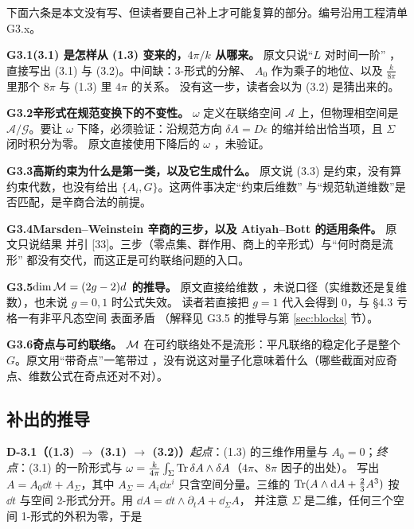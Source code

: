 下面六条是本文没有写、但读者要自己补上才可能复算的部分。编号沿用工程清单 G3.x。




\medskip
\noindent\textbf{G3.1}\quad \textbf{(3.1) 是怎样从 (1.3) 变来的，$4\pi/k$ 从哪来。}
原文只说“$L$ 对时间一阶” ，直接写出 (3.1) 与 (3.2)。中间缺：3-形式的分解、
$A_0$ 作为乘子的地位、以及 $\frac{k}{8\pi}$ 里那个 $8\pi$ 与 (1.3) 里 $4\pi$ 的关系。
没有这一步，读者会以为 (3.2) 是猜出来的。



\medskip
\noindent\textbf{G3.2}\quad \textbf{辛形式在规范变换下的不变性。}
$\omega$ 定义在联络空间 $\mathcal A$ 上，但物理相空间是 $\mathcal A/\mathcal G$。要让 $\omega$
下降，必须验证：沿规范方向 $\delta A=D\epsilon$ 的缩并给出恰当项，且 $\Sigma$ 闭时积分为零。
原文直接使用下降后的 $\omega$ ，未验证。



\medskip
\noindent\textbf{G3.3}\quad \textbf{高斯约束为什么是第一类，以及它生成什么。}
原文说 (3.3) 是约束，没有算约束代数，也没有给出 $\{A_i,G\}$。这两件事决定“约束后维数”
与“规范轨道维数”是否匹配，是辛商合法的前提。



\medskip
\noindent\textbf{G3.4}\quad \textbf{Marsden--Weinstein 辛商的三步，以及 Atiyah--Bott 的适用条件。}
原文只说结果  并引 [33]。三步（零点集、群作用、商上的辛形式）与“何时商是流形”
都没有交代，而这正是可约联络问题的入口。



\medskip
\noindent\textbf{G3.5}\quad \textbf{$\dim\mathcal{M}=(2g-2)d$ 的推导。}
原文直接给维数 ，未说口径（实维数还是复维数），也未说 $g=0,1$ 时公式失效。
读者若直接把 $g=1$ 代入会得到 0，与 §4.3 亏格一有非平凡态空间  表面矛盾
（解释见 G3.5 的推导与第 \ref{sec:blocks} 节）。



\medskip
\noindent\textbf{G3.6}\quad \textbf{奇点与可约联络。}
$\mathcal{M}$ 在可约联络处不是流形：平凡联络的稳定化子是整个 $G$。原文用``带奇点''一笔带过
，没有说这对量子化意味着什么（哪些截面对应奇点、维数公式在奇点还对不对）。


\subsection{补出的推导}

\noindent\textbf{D-3.1（(1.3) $\to$ (3.1) $\to$ (3.2)）}\quad\emph{起点}：(1.3) 的三维作用量与 $A_0=0$；\emph{终点}：(3.1) 的一阶形式与 $\omega=\frac{k}{4\pi}\int_\Sigma\operatorname{Tr}\delta A\wedge\delta A$（$4\pi$、$8\pi$ 因子的出处）。
写出 $A=A_0\dd t+A_\Sigma$，其中 $A_\Sigma=A_i\dd x^i$ 只含空间分量。三维的
$\operatorname{Tr}(A\wedge\mathrm{d} A+\tfrac23A^3)$ 按 $\dd t$ 与空间 2-形式分开。用 $\dd A=\dd t\wedge\partial_tA+\dd_\Sigma A$，
并注意 $\Sigma$ 是二维，任何三个空间 1-形式的外积为零，于是

